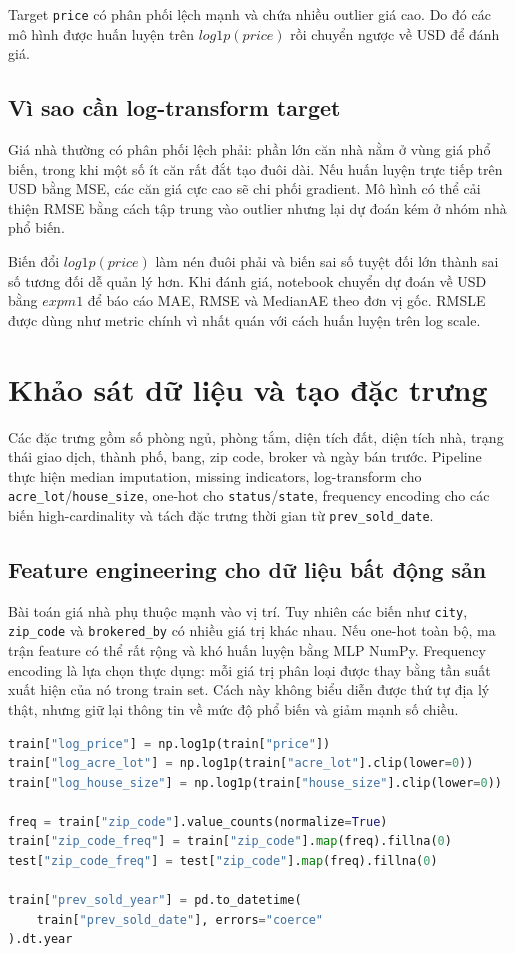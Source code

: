 \documentclass[12pt,a4paper]{report}
\begin{document}
Target \texttt{price} có phân phối lệch mạnh và chứa nhiều outlier giá cao. Do đó các mô hình được huấn luyện trên $log1p(price)$ rồi chuyển ngược về USD để đánh giá.

\subsection{Vì sao cần log-transform target}
Giá nhà thường có phân phối lệch phải: phần lớn căn nhà nằm ở vùng giá phổ biến, trong khi một số ít căn rất đắt tạo đuôi dài.
Nếu huấn luyện trực tiếp trên USD bằng MSE, các căn giá cực cao sẽ chi phối gradient.
Mô hình có thể cải thiện RMSE bằng cách tập trung vào outlier nhưng lại dự đoán kém ở nhóm nhà phổ biến.

Biến đổi $log1p(price)$ làm nén đuôi phải và biến sai số tuyệt đối lớn thành sai số tương đối dễ quản lý hơn.
Khi đánh giá, notebook chuyển dự đoán về USD bằng $expm1$ để báo cáo MAE, RMSE và MedianAE theo đơn vị gốc.
RMSLE được dùng như metric chính vì nhất quán với cách huấn luyện trên log scale.

\section{Khảo sát dữ liệu và tạo đặc trưng}
Các đặc trưng gồm số phòng ngủ, phòng tắm, diện tích đất, diện tích nhà, trạng thái giao dịch, thành phố, bang, zip code, broker và ngày bán trước. Pipeline thực hiện median imputation, missing indicators, log-transform cho \texttt{acre\_lot}/\texttt{house\_size}, one-hot cho \texttt{status}/\texttt{state}, frequency encoding cho các biến high-cardinality và tách đặc trưng thời gian từ \texttt{prev\_sold\_date}.

\subsection{Feature engineering cho dữ liệu bất động sản}
Bài toán giá nhà phụ thuộc mạnh vào vị trí.
Tuy nhiên các biến như \texttt{city}, \texttt{zip\_code} và \texttt{brokered\_by} có nhiều giá trị khác nhau.
Nếu one-hot toàn bộ, ma trận feature có thể rất rộng và khó huấn luyện bằng MLP NumPy.
Frequency encoding là lựa chọn thực dụng: mỗi giá trị phân loại được thay bằng tần suất xuất hiện của nó trong train set.
Cách này không biểu diễn được thứ tự địa lý thật, nhưng giữ lại thông tin về mức độ phổ biến và giảm mạnh số chiều.

\begin{lstlisting}[language=Python, caption={Minh họa feature engineering cho house price}, label={lst:house_feature_engineering}]
train["log_price"] = np.log1p(train["price"])
train["log_acre_lot"] = np.log1p(train["acre_lot"].clip(lower=0))
train["log_house_size"] = np.log1p(train["house_size"].clip(lower=0))

freq = train["zip_code"].value_counts(normalize=True)
train["zip_code_freq"] = train["zip_code"].map(freq).fillna(0)
test["zip_code_freq"] = test["zip_code"].map(freq).fillna(0)

train["prev_sold_year"] = pd.to_datetime(
    train["prev_sold_date"], errors="coerce"
).dt.year
\end{lstlisting}
\end{document}
